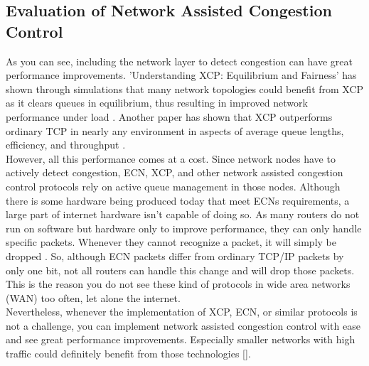 \documentclass[a4paper,conference]{IEEEtran}
\begin{document}
\subsection{Evaluation of Network Assisted Congestion Control}
As you can see, including the network layer to detect congestion can have great performance improvements. 'Understanding XCP: Equilibrium and Fairness' has shown through simulations that many network topologies could benefit from XCP as it clears queues in equilibrium, thus resulting in improved network performance under load \cite{1498331}. Another paper has shown that XCP outperforms ordinary TCP in nearly any environment in aspects of average queue lengths, efficiency, and throughput \cite{katabi2002congestion}.
\\However, all this performance comes at a cost. Since network nodes have to actively detect congestion, ECN, XCP, and other network assisted congestion control protocols rely on active queue management in those nodes. Although there is some hardware being produced today that meet ECNs requirements, a large part of internet hardware isn't capable of doing so. As many routers do not run on software but hardware only to improve performance, they can only handle specific packets. Whenever they cannot recognize a packet, it will simply be dropped \cite{katabi2002congestion}. So, although ECN packets differ from ordinary TCP/IP packets by only one bit, not all routers can handle this change and will drop those packets. This is the reason you do not see these kind of protocols in wide area networks (WAN) too often, let alone the internet.
\\Nevertheless, whenever the implementation of XCP, ECN, or similar protocols is not a challenge, you can implement network assisted congestion control with ease and see great performance improvements. Especially smaller networks with high traffic could definitely benefit from those technologies [].
\end{document}
